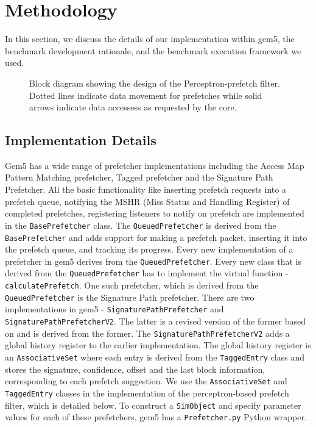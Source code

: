 \documentclass[10pt,conference]{IEEEtran}
\begin{document}
\section{Methodology}

In this section, we discuss the details of our implementation within gem5, the benchmark development rationale, and the benchmark execution framework we used.

\begin{figure}
    \centering
    \caption{Block diagram showing the design of the Perceptron-prefetch filter. Dotted lines indicate data movement for prefetches while solid arrows indicate data accessess as requested by the core.}
    \label{fig:block-ppf}
\end{figure}

\subsection{Implementation Details}\label{sec:impl}

Gem5 has a wide range of prefetcher implementations including the Access Map Pattern Matching prefetcher\cite{AMPM}, Tagged prefetcher and the Signature Path Prefetcher. All the basic functionality like inserting prefetch requests into a prefetch queue, notifying the MSHR (Miss Status and Handling Register) of completed prefetches, registering listeners to notify on prefetch are implemented in the \texttt{BasePrefetcher} class. The \texttt{QueuedPrefetcher} is derived from the \texttt{BasePrefetcher} and adds support for making a prefetch packet, inserting it into the prefetch queue, and tracking its progress. Every new implementation of a prefetcher in gem5 derives from the \texttt{QueuedPrefetcher}. Every new class that is derived from the \texttt{QueuedPrefetcher} has to implement the virtual function - \texttt{calculatePrefetch}. One such prefetcher, which is derived from the \texttt{QueuedPrefetcher} is the Signature Path prefetcher. There are two implementations in gem5 - \texttt{SignaturePathPrefetcher} and \texttt{SignaturePathPrefetcherV2}. The latter is a revised version of the former based on \cite{sppv2} and is derived from the former. The \texttt{SignaturePathPrefetcherV2} adds a global history register to the earlier implementation. The global history register is an \texttt{AssociativeSet} where each entry is derived from the \texttt{TaggedEntry} class and stores the signature, confidence, offset and the last block information, corresponding to each prefetch suggestion. We use the \texttt{AssociativeSet} and \texttt{TaggedEntry} classes in the implementation of the perceptron-based prefetch filter, which is detailed below. To construct a \texttt{SimObject} and specify parameter values for each of these prefetchers, gem5 has a \texttt{Prefetcher.py} Python wrapper.
\end{document}
